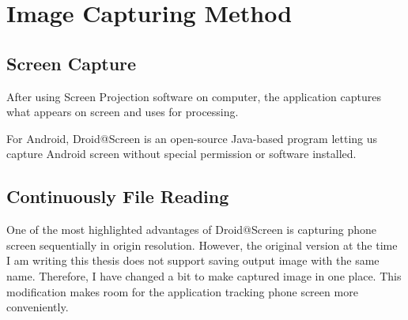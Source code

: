 \chapter{Image Capturing Method}
\label{ch:img_capture}
\section{Screen Capture}
After using Screen Projection software on computer, the application captures what appears on screen and uses for processing.

For Android, Droid@Screen \cite{droid_screen} is an open-source Java-based program letting us capture Android screen without special permission or software installed.

\section{Continuously File Reading}
One of the most highlighted advantages of Droid@Screen is capturing phone screen sequentially in origin resolution. However, the original version at the time I am writing this thesis does not support saving output image with the same name. Therefore, I have changed a bit to make captured image in one place. This modification makes room for the application tracking phone screen more conveniently.